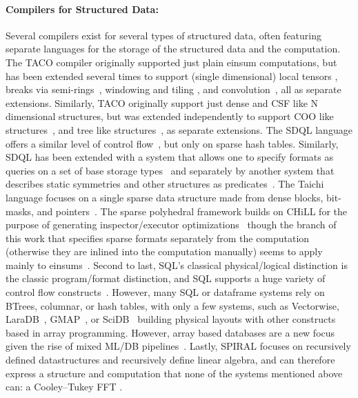 \paragraph{ Compilers for Structured Data:}
Several compilers exist for several types of structured data, often featuring separate languages for the storage of the structured data and the computation.
%
The TACO compiler originally supported just plain einsum computations\cite{kjolstad_tensor_2017}, but has been extended several times to support (single dimensional) local tensors \cite{kjolstad_tensor_2019}, breaks via semi-rings~\cite{henry_compilation_2021}, windowing and tiling \cite{senanayake2020sparse}, and convolution~\cite{won2023unified}, all as separate extensions.
%
Similarly, TACO originally support just dense and CSF like N dimensional structures, but was extended independently to support COO like structures~\cite{chou2018format}, and tree like structures~\cite{chou2022compilation}, as separate extensions.
%
The SDQL language offers a similar level of control flow~\cite{shaikhha2022functional}, but only on sparse hash tables.
%
Similarly, SDQL has been extended with a system that allows one to specify formats as queries on a set of base storage types~\cite{schleich2023optimizing} and separately by another system that describes static symmetries and other structures as predicates~\cite{ghorbani2023compiling}.
%
The Taichi language focuses on a single sparse data structure made from dense blocks, bit-masks, and pointers~\cite{hu_taichi_2019}.
%
%
The sparse polyhedral framework builds on CHiLL for the purpose of generating inspector/executor optimizations~\cite{strout2018sparse} though the branch of this work that specifies sparse formats separately from the computation (otherwise they are inlined into the computation manually) seems to apply mainly to einsums~\cite{zhao2022polyhedral}.
%
Second to last, SQL's classical physical/logical distinction is the classic program/format distinction, and SQL supports a huge variety of control flow constructs~\cite{kotlyar1997relational, date1989guide}.
%
However, many SQL or dataframe systems rely on BTrees, columnar, or hash tables, with only a few systems, such as Vectorwise\cite{boncz2012vectorwise}, LaraDB~\cite{hutchison2017laradb}, GMAP~\cite{tsatalos1996gmap}, or SciDB~\cite{stonebraker2013scidb} building physical layouts with other constructs based in array programming.
%
However, array based databases are a new focus given the rise of mixed ML/DB pipelines~\cite{baumann2021array,luo2018scalable}.
%
Lastly, SPIRAL focuses on recursively defined datastructures and recursively define linear algebra, and can therefore express a structure and computation that none of the systems mentioned above can: a Cooley–Tukey FFT \cite{franchetti2018spiral,franchetti2009operator}.
%

